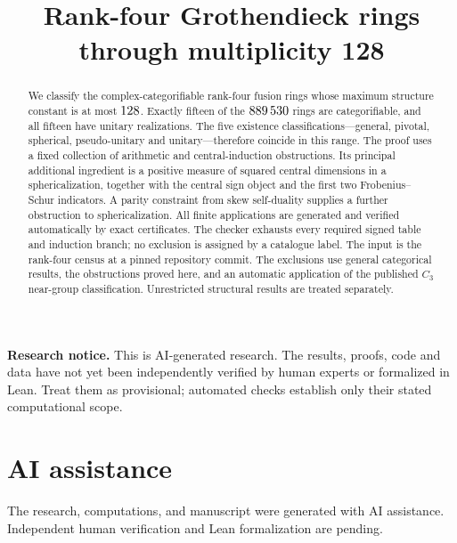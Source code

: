 \documentclass[11pt]{article}
\title{Rank-four Grothendieck rings\\through multiplicity 128}
\date{}
\begin{document}
\maketitle
\begin{abstract}
We classify the complex-categorifiable rank-four fusion rings whose maximum
structure constant is at most $128$. Exactly fifteen of the $889\,530$ rings are categorifiable, and all fifteen have
unitary realizations. The five existence classifications---general, pivotal,
spherical, pseudo-unitary and unitary---therefore coincide in this range.
The proof uses a fixed collection of arithmetic and central-induction
obstructions. Its principal additional ingredient is a positive measure of
squared central dimensions in a sphericalization, together with the central
sign object and the first two Frobenius--Schur indicators. A parity
constraint from skew self-duality supplies a further obstruction to
sphericalization. All finite applications are generated and verified automatically by exact
certificates. The checker exhausts every required signed
table and induction branch; no exclusion is assigned by a catalogue label.
The input is the rank-four census at a pinned repository commit. The exclusions use general
categorical results, the obstructions proved here, and an automatic
application of the published $C_3$ near-group classification.
Unrestricted structural results are treated separately.
\end{abstract}
\par\medskip\noindent\textbf{Research notice.}
This is AI-generated research. The results, proofs, code and data have not yet
been independently verified by human experts or formalized in Lean. Treat them
as provisional; automated checks establish only their stated computational scope.
\par\medskip

\tableofcontents








\appendix



\section*{AI assistance}
The research, computations, and manuscript were generated with AI assistance. Independent human verification and Lean formalization are pending.

\end{document}
